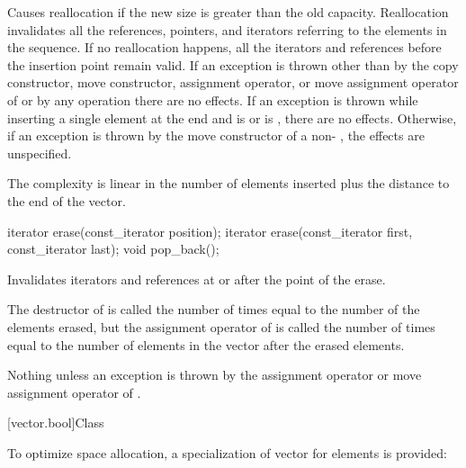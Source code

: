 \begin{itemdescr}
\pnum
\remarks
Causes reallocation if the new size is greater than the old capacity.
Reallocation invalidates all the references, pointers, and iterators
referring to the elements in the sequence.
If no reallocation happens, all the iterators and references before the insertion point remain valid.
If an exception is thrown other than by
the copy constructor, move constructor,
assignment operator, or move assignment operator of
 or by any  operation
there are no effects.
If an exception is thrown while inserting a single element at the end and
 is  or 
is , there are no effects.
Otherwise, if an exception is thrown by the move constructor of a non-
, the effects are unspecified.

\pnum
\complexity
The complexity is linear in the number of elements inserted plus the distance
to the end of the vector.
\end{itemdescr}

%
\begin{itemdecl}
iterator erase(const_iterator position);
iterator erase(const_iterator first, const_iterator last);
void pop_back();
\end{itemdecl}

\begin{itemdescr}
\pnum
\effects
Invalidates iterators and references at or after the point of the erase.

\pnum
\complexity
The destructor of  is called the number of times equal to the
number of the elements erased, but the assignment operator
of  is called the number of times equal to the number of
elements in the vector after the erased elements.

\pnum
\throws
Nothing unless an exception is thrown by the
assignment operator or move assignment operator of
.
\end{itemdescr}

[vector.bool]{Class }

\pnum
{}%
To optimize space allocation, a specialization of vector for
elements is provided:

